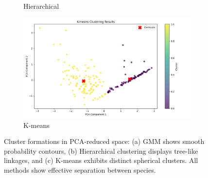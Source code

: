 \documentclass[a4paper,12pt]{report}
\begin{document}
\begin{figure}[htbp]
\begin{subfigure}[b]{0.32\textwidth}
        \caption{Hierarchical}
        \label{fig:hierarchical_cluster}
    \end{subfigure}
    \hfill
    \begin{subfigure}[b]{0.32\textwidth}
        \centering
        \includegraphics[width=\textwidth]{images/clustering/kmeans_clustering.png}
        \caption{K-means}
        \label{fig:kmeans_cluster}
    \end{subfigure}
    \caption{Cluster formations in PCA-reduced space: (a) GMM shows smooth probability contours, (b) Hierarchical clustering displays tree-like linkages, and (c) K-means exhibits distinct spherical clusters. All methods show effective separation between species.}
    \label{fig:cluster_visualizations}
\end{figure}
\end{document}
